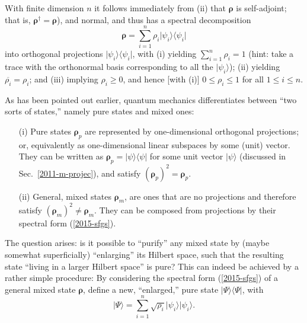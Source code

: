 With finite dimension $n$ it follows immediately from (ii)
that $\boldsymbol{\rho}$ is self-adjoint; that is,
${\boldsymbol{\rho}}^\dagger ={\boldsymbol{\rho}}$), and normal, and thus has a spectral decomposition
\begin{equation}
\boldsymbol{\rho} =\sum_{i=1}^n \rho_i \vert \psi_i\rangle \langle \psi_i \vert
\label{2015-sfgs}
\end{equation}
into orthogonal projections $\vert \psi_i\rangle \langle \psi_i \vert$,
with
(i) yielding $\sum_{i=1}^n\rho_i =1$
(hint: take a trace with the orthonormal basis corresponding to all the $\vert \psi_i\rangle$);
(ii) yielding  $\overline{\rho_i}=\rho_i$;
and (iii) implying $\rho_i \ge 0$, and hence [with (i)] $0 \le \rho_i \le 1$
for all $1\le i \le n$.


As has been pointed out earlier, quantum mechanics differentiates between ``two sorts of states,'' namely
pure states and mixed ones:
\begin{itemize}
\item[(i)]
Pure states ${\boldsymbol{\rho}}_p$  are
represented by one-dimensional orthogonal projections; or, equivalently as one-dimensional linear subspaces by some (unit) vector.
They can be written as ${\boldsymbol{\rho}}_p =  \vert \psi \rangle \langle \psi  \vert$ for some unit vector $\vert \psi \rangle$
(discussed in Sec.~\ref{2011-m-projec}), and
satisfy $({\boldsymbol{\rho}}_p)^2={\boldsymbol{\rho}}_p$.
\item[(ii)]
General, mixed states ${\boldsymbol{\rho}}_m$, are ones that are no projections and therefore
satisfy $({\boldsymbol{\rho}}_m)^2 \neq {\boldsymbol{\rho}}_m$.
They can be composed from projections by their spectral form (\ref{2015-sfgs}).
\end{itemize}

The question arises: is it possible to ``purify'' any mixed state by (maybe somewhat superficially) ``enlarging'' its
Hilbert space, such that the resulting state ``living in a larger Hilbert space'' is pure?
This can indeed be achieved by a rather simple procedure:
By considering the spectral form (\ref{2015-sfgs}) of a general mixed state ${\boldsymbol{\rho}}$,
define a new, ``enlarged,'' pure state  $\vert \Psi\rangle \langle \Psi \vert$, with
\begin{equation}
\vert \Psi\rangle = \sum_{i=1}^n \sqrt{\rho_i}  \vert \psi_i\rangle  \vert \psi_i\rangle
.
\label{2015-puran}
\end{equation}

